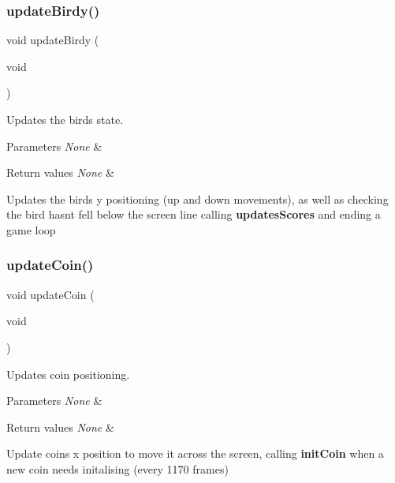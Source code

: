 \subsubsection{\texorpdfstring{update\+Birdy()}{updateBirdy()}}
{\footnotesize\ttfamily void update\+Birdy (\begin{DoxyParamCaption}\item[{void}]{ }\end{DoxyParamCaption})}



Updates the birds state. 


\begin{DoxyParams}{Parameters}
{\em None} & \\
\hline
\end{DoxyParams}

\begin{DoxyRetVals}{Return values}
{\em None} & \\
\hline
\end{DoxyRetVals}
Updates the birds y positioning (up and down movements), as well as checking the bird hasn\textquotesingle{}t fell below the screen line calling {\bfseries updates\+Scores} and ending a game loop \mbox{\label{group___flappy___bird_ga7ca93fcd8c7440e7b3f64c595a5be28c}} 
\subsubsection{\texorpdfstring{update\+Coin()}{updateCoin()}}
{\footnotesize\ttfamily void update\+Coin (\begin{DoxyParamCaption}\item[{void}]{ }\end{DoxyParamCaption})}



Updates coin positioning. 


\begin{DoxyParams}{Parameters}
{\em None} & \\
\hline
\end{DoxyParams}

\begin{DoxyRetVals}{Return values}
{\em None} & \\
\hline
\end{DoxyRetVals}
Update coins x position to move it across the screen, calling {\bfseries init\+Coin} when a new coin needs initalising (every 1170 frames) \mbox{\label{group___flappy___bird_gae103b6fea2d41881b821fff74047d2ac}} 
